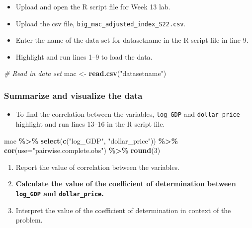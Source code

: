 \documentclass[
]{report}
\newenvironment{Shaded}{\begin{snugshade}}{\end{snugshade}}
\newcommand{\AttributeTok}[1]{\textcolor[rgb]{0.13,0.29,0.53}{#1}}
\newcommand{\CommentTok}[1]{\textcolor[rgb]{0.56,0.35,0.01}{\textit{#1}}}
\newcommand{\DecValTok}[1]{\textcolor[rgb]{0.00,0.00,0.81}{#1}}
\newcommand{\FunctionTok}[1]{\textcolor[rgb]{0.13,0.29,0.53}{\textbf{#1}}}
\newcommand{\NormalTok}[1]{#1}
\newcommand{\OtherTok}[1]{\textcolor[rgb]{0.56,0.35,0.01}{#1}}
\newcommand{\SpecialCharTok}[1]{\textcolor[rgb]{0.81,0.36,0.00}{\textbf{#1}}}
\newcommand{\StringTok}[1]{\textcolor[rgb]{0.31,0.60,0.02}{#1}}
\providecommand{\tightlist}{%
  \setlength{\itemsep}{0pt}\setlength{\parskip}{0pt}}
\begin{document}
\begin{itemize}
\item
  Upload and open the R script file for Week 13 lab.
\item
  Upload the csv file, \texttt{big\_mac\_adjusted\_index\_S22.csv}.
\item
  Enter the name of the data set for datasetname in the R script file in line 9.
\item
  Highlight and run lines 1--9 to load the data.
\end{itemize}

\begin{Shaded}
\begin{Highlighting}[]
\CommentTok{\# Read in data set }
\NormalTok{mac }\OtherTok{\textless{}{-}} \FunctionTok{read.csv}\NormalTok{(}\StringTok{"datasetname"}\NormalTok{)}
\end{Highlighting}
\end{Shaded}

\subsubsection*{Summarize and visualize the data}\label{summarize-and-visualize-the-data-7}

\begin{itemize}
\tightlist
\item
  To find the correlation between the variables, \texttt{log\_GDP} and \texttt{dollar\_price} highlight and run lines 13--16 in the R script file.
\end{itemize}

\begin{Shaded}
\begin{Highlighting}[]
\NormalTok{mac }\SpecialCharTok{\%\textgreater{}\%} 
  \FunctionTok{select}\NormalTok{(}\FunctionTok{c}\NormalTok{(}\StringTok{"log\_GDP"}\NormalTok{, }\StringTok{"dollar\_price"}\NormalTok{)) }\SpecialCharTok{\%\textgreater{}\%}
  \FunctionTok{cor}\NormalTok{(}\AttributeTok{use=}\StringTok{"pairwise.complete.obs"}\NormalTok{) }\SpecialCharTok{\%\textgreater{}\%}
  \FunctionTok{round}\NormalTok{(}\DecValTok{3}\NormalTok{)}
\end{Highlighting}
\end{Shaded}

\begin{enumerate}
\def\labelenumi{\arabic{enumi}.}
\item
  Report the value of correlation between the variables.
  \vspace{0.2in}
\item
  \textbf{Calculate the value of the coefficient of determination between \texttt{log\_GDP} and \texttt{dollar\_price}.}
  \vspace{0.4in}
\item
  Interpret the value of the coefficient of determination in context of the problem.
  \vspace{0.6in}
\end{enumerate}
\end{document}
